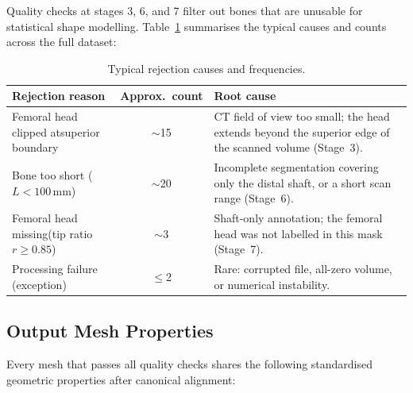 \documentclass[12pt,a4paper]{article}
\begin{document}
Quality checks at stages 3, 6, and 7 filter out bones that are unusable for
statistical shape modelling.  Table~\ref{tab:rejections} summarises the typical
causes and counts across the full dataset:

\begin{table}[H]
\centering
\caption{Typical rejection causes and frequencies.}
\label{tab:rejections}
\renewcommand{\arraystretch}{1.35}
\begin{tabular}{@{}p{5.2cm}cp{6.2cm}@{}}
\toprule
\textbf{Rejection reason} & \textbf{Approx.\ count} & \textbf{Root cause} \\
\midrule
Femoral head clipped at\newline superior boundary &
        $\sim$15 &
        CT field of view too small; the head extends beyond the superior edge
        of the scanned volume (Stage~3). \\
\addlinespace
Bone too short ($L < 100$\,mm) &
        $\sim$20 &
        Incomplete segmentation covering only the distal shaft, or a short scan
        range (Stage~6). \\
\addlinespace
Femoral head missing\newline (tip ratio $r \geq 0.85$) &
        $\sim$3 &
        Shaft-only annotation; the femoral head was not labelled in this mask
        (Stage~7). \\
\addlinespace
Processing failure (exception) &
        $\leq$2 &
        Rare: corrupted file, all-zero volume, or numerical instability. \\
\bottomrule
\end{tabular}
\end{table}

\subsection{Output Mesh Properties}

Every mesh that passes all quality checks shares the following standardised
geometric properties after canonical alignment:
\end{document}
